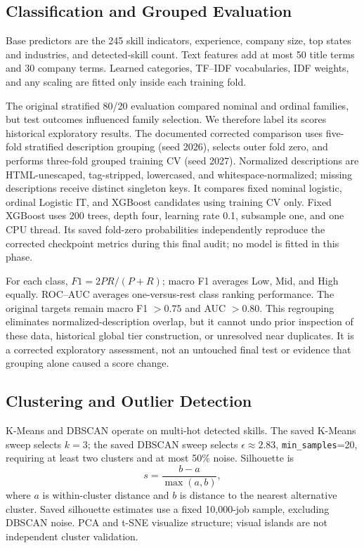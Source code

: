 \documentclass[sigconf,nonacm]{acmart}
\begin{document}
\subsection{Classification and Grouped Evaluation}
Base predictors are the 245 skill indicators, experience, company size, top states and industries, and detected-skill count. Text features add at most 50 title terms and 30 company terms. Learned categories, TF--IDF vocabularies, IDF weights, and any scaling are fitted only inside each training fold.

The original stratified 80/20 evaluation compared nominal and ordinal families, but test outcomes influenced family selection. We therefore label its scores historical exploratory results. The documented corrected comparison uses five-fold stratified description grouping (seed 2026), selects outer fold zero, and performs three-fold grouped training CV (seed 2027). Normalized descriptions are HTML-unescaped, tag-stripped, lowercased, and whitespace-normalized; missing descriptions receive distinct singleton keys. It compares fixed nominal logistic, ordinal Logistic IT, and XGBoost candidates using training CV only. Fixed XGBoost uses 200 trees, depth four, learning rate 0.1, subsample one, and one CPU thread. Its saved fold-zero probabilities independently reproduce the corrected checkpoint metrics during this final audit; no model is fitted in this phase.

For each class, $F1=2PR/(P+R)$; macro F1 averages Low, Mid, and High equally. ROC--AUC averages one-versus-rest class ranking performance. The original targets remain macro F1 $>0.75$ and AUC $>0.80$. This regrouping eliminates normalized-description overlap, but it cannot undo prior inspection of these data, historical global tier construction, or unresolved near duplicates. It is a corrected exploratory assessment, not an untouched final test or evidence that grouping alone caused a score change.

\subsection{Clustering and Outlier Detection}
K-Means and DBSCAN operate on multi-hot detected skills. The saved K-Means sweep selects $k=3$; the saved DBSCAN sweep selects $\epsilon\approx2.83$, \texttt{min\_samples}=20, requiring at least two clusters and at most 50\% noise. Silhouette is
\begin{equation}
s=\frac{b-a}{\max(a,b)},
\end{equation}
where $a$ is within-cluster distance and $b$ is distance to the nearest alternative cluster. Saved silhouette estimates use a fixed 10,000-job sample, excluding DBSCAN noise. PCA and t-SNE visualize structure; visual islands are not independent cluster validation.
\end{document}

